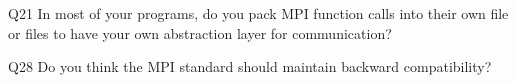 \begin{description}%
\item{Q21} In most of your programs, do you pack MPI function calls into their own file or files to have your own abstraction layer for communication?%
\item{Q28} Do you think the MPI standard should maintain backward compatibility?%
\end{description}%
